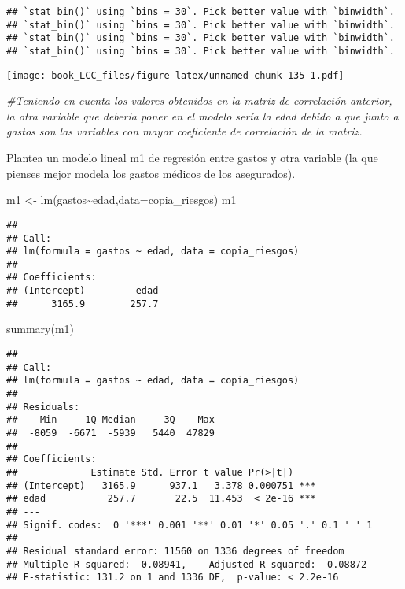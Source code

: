 \documentclass[
]{book}
\newenvironment{Shaded}{\begin{snugshade}}{\end{snugshade}}
\newcommand{\AttributeTok}[1]{\textcolor[rgb]{0.77,0.63,0.00}{#1}}
\newcommand{\CommentTok}[1]{\textcolor[rgb]{0.56,0.35,0.01}{\textit{#1}}}
\newcommand{\FunctionTok}[1]{\textcolor[rgb]{0.00,0.00,0.00}{#1}}
\newcommand{\NormalTok}[1]{#1}
\newcommand{\OtherTok}[1]{\textcolor[rgb]{0.56,0.35,0.01}{#1}}
\newcommand{\SpecialCharTok}[1]{\textcolor[rgb]{0.00,0.00,0.00}{#1}}
\begin{document}
\begin{verbatim}
## `stat_bin()` using `bins = 30`. Pick better value with `binwidth`.
## `stat_bin()` using `bins = 30`. Pick better value with `binwidth`.
## `stat_bin()` using `bins = 30`. Pick better value with `binwidth`.
## `stat_bin()` using `bins = 30`. Pick better value with `binwidth`.
\end{verbatim}

\texttt{[image: book\_LCC\_files/figure-latex/unnamed-chunk-135-1.pdf]}

\begin{Shaded}
\begin{Highlighting}[]
\CommentTok{\#Teniendo en cuenta los valores obtenidos en la matriz de correlación anterior, la otra variable que deberia poner en el modelo sería la edad debido a que junto a gastos son las variables con mayor coeficiente de correlación de la matriz. }
\end{Highlighting}
\end{Shaded}

Plantea un modelo lineal m1 de regresión entre gastos y otra variable (la que pienses mejor modela los gastos médicos de los asegurados).

\begin{Shaded}
\begin{Highlighting}[]
\NormalTok{m1 }\OtherTok{\textless{}{-}} \FunctionTok{lm}\NormalTok{(gastos}\SpecialCharTok{\textasciitilde{}}\NormalTok{edad,}\AttributeTok{data=}\NormalTok{copia\_riesgos)}
\NormalTok{m1}
\end{Highlighting}
\end{Shaded}

\begin{verbatim}
## 
## Call:
## lm(formula = gastos ~ edad, data = copia_riesgos)
## 
## Coefficients:
## (Intercept)         edad  
##      3165.9        257.7
\end{verbatim}

\begin{Shaded}
\begin{Highlighting}[]
\FunctionTok{summary}\NormalTok{(m1)}
\end{Highlighting}
\end{Shaded}

\begin{verbatim}
## 
## Call:
## lm(formula = gastos ~ edad, data = copia_riesgos)
## 
## Residuals:
##    Min     1Q Median     3Q    Max 
##  -8059  -6671  -5939   5440  47829 
## 
## Coefficients:
##             Estimate Std. Error t value Pr(>|t|)    
## (Intercept)   3165.9      937.1   3.378 0.000751 ***
## edad           257.7       22.5  11.453  < 2e-16 ***
## ---
## Signif. codes:  0 '***' 0.001 '**' 0.01 '*' 0.05 '.' 0.1 ' ' 1
## 
## Residual standard error: 11560 on 1336 degrees of freedom
## Multiple R-squared:  0.08941,    Adjusted R-squared:  0.08872 
## F-statistic: 131.2 on 1 and 1336 DF,  p-value: < 2.2e-16
\end{verbatim}
\end{document}

